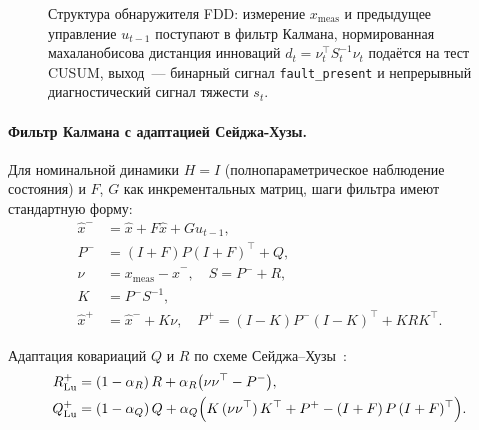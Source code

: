 \documentclass[a4paper,14pt]{extarticle}
\newcommand{\FDD}{\textsc{FDD}}
\newcommand{\CUSUM}{\textsc{CUSUM}}
\begin{document}
\begin{figure}[H]
\centering
{}
\caption{Структура обнаружителя \FDD{}: измерение $x_{\text{meas}}$ и предыдущее управление $u_{t-1}$ поступают в фильтр Калмана, нормированная махаланобисова дистанция инноваций $d_t = \nu_t^\top S_t^{-1} \nu_t$ подаётся на тест \CUSUM{}, выход~--- бинарный сигнал \texttt{fault\_present} и непрерывный диагностический сигнал тяжести $s_t$.}
\label{fig:fdd}
\end{figure}

\paragraph{Фильтр Калмана с адаптацией Сейджа-Хузы.} Для номинальной динамики $H = I$ (полнопараметрическое наблюдение состояния) и $F$, $G$ как инкрементальных матриц, шаги фильтра имеют стандартную форму:
\begin{align}
\hat x^- &= \hat x + F \hat x + G u_{t-1}, \\
P^- &= (I+F) P (I+F)^\top + Q, \\
\nu  &= x_{\text{meas}} - \hat x^-, \quad S = P^- + R, \\
K  &= P^- S^{-1}, \\
\hat x^+ &= \hat x^- + K\nu, \quad P^+ = (I-K) P^- (I-K)^\top + K R K^\top.
\end{align}

Адаптация ковариаций $Q$ и $R$ по схеме Сейджа--Хузы~\cite{sage1969,lu2015}:
\begin{align}
R^+_{\text{Lu}} &= (1-\alpha_R)\,R + \alpha_R \bigl(\nu\nu^\top - P^-\bigr), \label{eq:lu-R}\\
Q^+_{\text{Lu}} &= (1-\alpha_Q)\,Q + \alpha_Q \Bigl(K\,(\nu\nu^\top)\,K^\top + P^+ - (I+F)\,P\,(I+F)^\top\Bigr). \label{eq:lu-Q}
\end{align}
\end{document}
